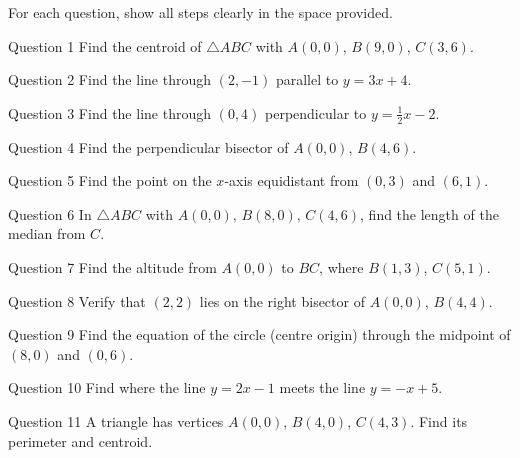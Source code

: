 \documentclass[11pt]{article}
\begin{document}
\clearpage
{}
For each question, show all steps clearly in the space provided.

\begin{qbox}{Question 1}
Find the centroid of $\triangle ABC$ with $A(0,0)$, $B(9,0)$, $C(3,6)$.\workspace{2.4cm}
\end{qbox}

\begin{qbox}{Question 2}
Find the line through $(2,-1)$ parallel to $y=3x+4$.\workspace{2.2cm}
\end{qbox}

\begin{qbox}{Question 3}
Find the line through $(0,4)$ perpendicular to $y=\tfrac12x-2$.\workspace{2.4cm}
\end{qbox}

\begin{qbox}{Question 4}
Find the perpendicular bisector of $A(0,0)$, $B(4,6)$.\workspace{2.6cm}
\end{qbox}

\begin{qbox}{Question 5}
Find the point on the $x$-axis equidistant from $(0,3)$ and $(6,1)$.\workspace{2.8cm}
\end{qbox}

\begin{qbox}{Question 6}
In $\triangle ABC$ with $A(0,0)$, $B(8,0)$, $C(4,6)$, find the length of the median from $C$.\workspace{2.6cm}
\end{qbox}

\begin{qbox}{Question 7}
Find the altitude from $A(0,0)$ to $BC$, where $B(1,3)$, $C(5,1)$.\workspace{2.6cm}
\end{qbox}

\begin{qbox}{Question 8}
Verify that $(2,2)$ lies on the right bisector of $A(0,0)$, $B(4,4)$.\workspace{2.6cm}
\end{qbox}

\begin{qbox}{Question 9}
Find the equation of the circle (centre origin) through the midpoint of $(8,0)$ and $(0,6)$.\workspace{2.6cm}
\end{qbox}

\begin{qbox}{Question 10}
Find where the line $y=2x-1$ meets the line $y=-x+5$.\workspace{2.4cm}
\end{qbox}

\begin{qbox}{Question 11}
A triangle has vertices $A(0,0)$, $B(4,0)$, $C(4,3)$. Find its perimeter and centroid.\workspace{2.8cm}
\end{qbox}
\end{document}
